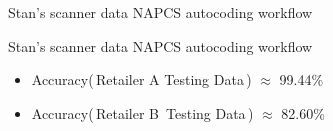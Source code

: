 

\begin{frame}{\vskip -0.1cm\large Stan's scanner data NAPCS autocoding workflow}



\end{frame}
\normalsize


\begin{frame}{\vskip -0.1cm\large Stan's scanner data NAPCS autocoding workflow}

\large

\begin{itemize}
\item
	Accuracy(\,Retailer A Testing Data\,) \; $\approx$ \; {\Huge 99.44\%}
	\vskip 1.0cm
	
\item
	Accuracy(\,Retailer B\, Testing Data\,) \; $\approx$ \; {\Huge 82.60\%}
\end{itemize}

\end{frame}
\normalsize

